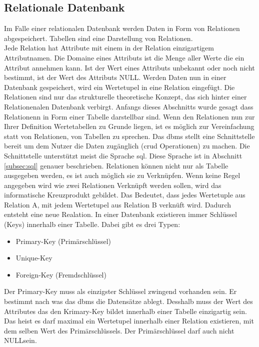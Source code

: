\subsection{Relationale Datenbank}\label{subsec:relDB}
Im Falle einer relationalen Datenbank werden Daten in Form von Relationen abgespeichert.
Tabellen sind eine Darstellung von Relationen.\\
Jede Relation hat Attribute mit einem in der Relation einzigartigem Attributnamen.
Die Domaine eines Attributs ist die Menge aller Werte die ein Attribut annehmen kann.
Ist der Wert eines Attributs unbekannt oder noch nicht bestimmt, ist der Wert des Attributs \flqq NULL\frqq\citep{Studer:2016:2}.
Werden Daten nun in einer Datenbank gespeichert, wird ein Wertetupel in eine Relation eingefügt.
Die Relationen sind nur das strukturelle theoretische Konzept, das sich hinter einer Relationenalen Datenbank verbirgt.
Anfangs dieses Abschnitts wurde gesagt dass Relationenn in Form einer Tabelle darstellbar sind.
Wenn den Relationen nun zur Ihrer Definition Wertetabellen zu Grunde liegen, 
ist es möglich zur Vereinfachung statt von Relationen, von Tabellen zu sprechen.
Das \ac{dbms} stellt eine Schnittstelle bereit um dem Nutzer die Daten zugänglich (\ac{crud} Operationen) zu machen.
Die Schnittstelle unterstützt meist die Sprache \ac{sql}. Diese Sprache ist in Abschnitt \ref{subsec:sql} genauer beschrieben.
Relationen können nicht nur als Tabelle ausgegeben werden, es ist auch möglich sie zu Verknüpfen.
Wenn keine Regel angegeben wird wie zwei Relationen Verknüpft werden sollen, wird das informatische Kreuzprodukt gebildet.
Das Bedeutet, dass jedes Wertetuple aus Relation A, mit jedem Wertetupel aus Relation B verknüft wird. 
Dadurch entsteht eine neue Realation.
In einer Datenbank existieren immer Schlüssel (Keys) innerhalb einer Tabelle.
Dabei gibt es drei Typen:
\begin{itemize}
  \item Primary-Key (Primärschlüssel)
  \item Unique-Key
  \item Foreign-Key (Fremdschlüssel)
\end{itemize}
Der Primary-Key muss als einzigster Schlüssel zwingend vorhanden sein. Er bestimmt nach was das \ac{dbms} die Datensätze ablegt.
Desshalb muss der Wert des Attributes das den Krimary-Key bildet innerhalb einer Tabelle einzigartig sein.
Das heist es darf maximal ein Wertetupel innerhalb einer Relation existieren, mit dem selben Wert des Primärschlüssels.
Der Primärschlüssel darf auch nicht \flqq NULL\frqq{}sein.
